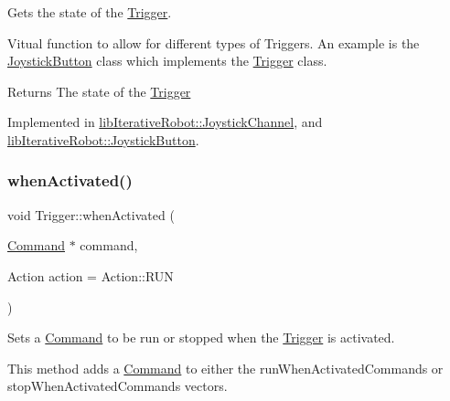 Gets the state of the \mbox{\hyperlink{classlib_iterative_robot_1_1_trigger}{Trigger}}. 

Vitual function to allow for different types of Triggers. An example is the \mbox{\hyperlink{classlib_iterative_robot_1_1_joystick_button}{Joystick\+Button}} class which implements the \mbox{\hyperlink{classlib_iterative_robot_1_1_trigger}{Trigger}} class.

\begin{DoxyReturn}{Returns}
The state of the \mbox{\hyperlink{classlib_iterative_robot_1_1_trigger}{Trigger}} 
\end{DoxyReturn}


Implemented in \mbox{\hyperlink{classlib_iterative_robot_1_1_joystick_channel_a2f7c748f53c30fbbde34c14aa494343e}{lib\+Iterative\+Robot\+::\+Joystick\+Channel}}, and \mbox{\hyperlink{classlib_iterative_robot_1_1_joystick_button_ac17a3cda9edaf3a38bb87070c47191a1}{lib\+Iterative\+Robot\+::\+Joystick\+Button}}.

\mbox{\label{classlib_iterative_robot_1_1_trigger_a1e98ebb42428b05ccab7dda82b9e58dc}} 
\subsubsection{\texorpdfstring{whenActivated()}{whenActivated()}}
{\footnotesize\ttfamily void Trigger\+::when\+Activated (\begin{DoxyParamCaption}\item[{\mbox{\hyperlink{classlib_iterative_robot_1_1_command}{Command}} $\ast$}]{command,  }\item[{Action}]{action = {\ttfamily Action\+:\+:RUN} }\end{DoxyParamCaption})\hspace{0.3cm}{\ttfamily [protected]}}



Sets a \mbox{\hyperlink{classlib_iterative_robot_1_1_command}{Command}} to be run or stopped when the \mbox{\hyperlink{classlib_iterative_robot_1_1_trigger}{Trigger}} is activated. 

This method adds a \mbox{\hyperlink{classlib_iterative_robot_1_1_command}{Command}} to either the run\+When\+Activated\+Commands or stop\+When\+Activated\+Commands vectors.


